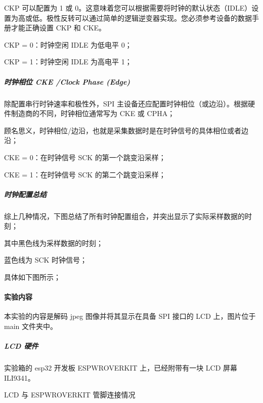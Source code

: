 \documentclass[a4paper,12pt,english]{sphinxmanual}
\begin{document}
{{\sphinxAtStartPar
CKP 可以配置为 1 或 0。这意味着您可以根据需要将时钟的默认状态（IDLE）设置为高或低。极性反转可以通过简单的逻辑逆变器实现。您必须参考设备的数据手册才能正确设置 CKP 和 CKE。

\sphinxAtStartPar
CKP = 0：时钟空闲 IDLE 为低电平 0；

\sphinxAtStartPar
CKP = 1：时钟空闲 IDLE 为高电平 1；


\subparagraph{时钟相位 CKE /Clock Phase (Edge)}
\label{\detokenize{exp-esp32/peripherals/lcd_spi:cke-clock-phase-edge}}
\sphinxAtStartPar
除配置串行时钟速率和极性外，SPI 主设备还应配置时钟相位（或边沿）。根据硬件制造商的不同，时钟相位通常写为 CKE 或 CPHA；

\sphinxAtStartPar
顾名思义，时钟相位/边沿，也就是采集数据时是在时钟信号的具体相位或者边沿；

\sphinxAtStartPar
CKE = 0：在时钟信号 SCK 的第一个跳变沿采样；

\sphinxAtStartPar
CKE = 1：在时钟信号 SCK 的第二个跳变沿采样；


\subparagraph{时钟配置总结}
\label{\detokenize{exp-esp32/peripherals/lcd_spi:id5}}
\sphinxAtStartPar
综上几种情况，下图总结了所有时钟配置组合，并突出显示了实际采样数据的时刻；

\sphinxAtStartPar
其中黑色线为采样数据的时刻；

\sphinxAtStartPar
蓝色线为 SCK 时钟信号；

\sphinxAtStartPar
具体如下图所示；

\sphinxAtStartPar
{}


\paragraph{实验内容}
\label{\detokenize{exp-esp32/peripherals/lcd_spi:id6}}
\sphinxAtStartPar
本实验的内容是解码 jpeg 图像并将其显示在具备 SPI 接口的 LCD 上，图片位于 main 文件夹中。


\subparagraph{LCD 硬件}
\label{\detokenize{exp-esp32/peripherals/lcd_spi:lcd}}
\sphinxAtStartPar
实验箱的 esp32 开发板 ESP\sphinxhyphen{}WROVER\sphinxhyphen{}KIT 上，已经附带有一块 LCD 屏幕 ILI9341。

\sphinxAtStartPar
LCD 与 ESP\sphinxhyphen{}WROVER\sphinxhyphen{}KIT 管脚连接情况


}}
\end{document}
